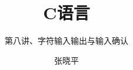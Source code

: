 \documentclass[12pt,notheorems]{beamer}
\begin{document}
\title{C语言}
\subtitle{第八讲、字符输入输出与输入确认}
\author{张晓平}


\begin{frame}[plain]\transboxout
\titlepage
\end{frame}

\begin{frame}[allowframebreaks]\transboxin
\begin{center}
\tableofcontents[hideallsubsections]
\end{center}
\end{frame}

                  
                  


% 



\end{document}
